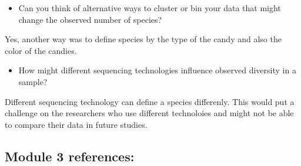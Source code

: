 \documentclass[]{article}
\providecommand{\tightlist}{%
  \setlength{\itemsep}{0pt}\setlength{\parskip}{0pt}}
\begin{document}
\begin{itemize}
\tightlist
\item
  Can you think of alternative ways to cluster or bin your data that
  might change the observed number of species?
\end{itemize}

Yes, another way was to define species by the type of the candy and also
the color of the candies.

\begin{itemize}
\tightlist
\item
  How might different sequencing technologies influence observed
  diversity in a sample?
\end{itemize}

Different sequencing technology can define a species differenly. This
would put a challenge on the researchers who use different technoloies
and might not be able to compare their data in future studies.

\subsection{Module 3 references:}\label{module-3-references}
\end{document}
